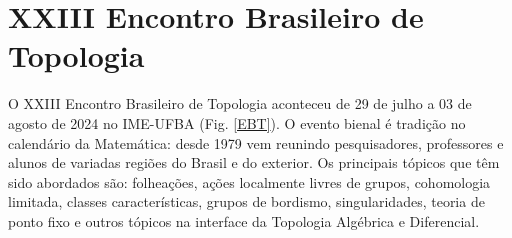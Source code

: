 \documentclass{hipatia}
\begin{document}







\section{XXIII Encontro Brasileiro de Topologia} %

%
%
%
%

O XXIII Encontro Brasileiro de Topologia aconteceu de 29 de julho a 03 de agosto de 2024 no IME-UFBA (Fig. \ref{EBT}).
O evento bienal é tradição no calendário da Matemática: desde 1979 vem reunindo pesquisadores, professores e alunos de variadas regiões do Brasil e do exterior. Os principais tópicos que têm sido abordados são: folheações, ações localmente livres de grupos, cohomologia limitada, classes características, grupos de bordismo, singularidades, teoria de ponto fixo e outros tópicos na interface da Topologia Algébrica e Diferencial.
\end{document}
